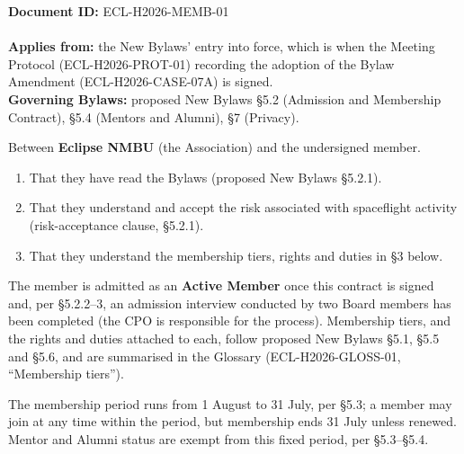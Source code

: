 \documentclass{../../../Common/Latex/Templates/rapport}
\date{\meetingdate, \meetingtime}
\begin{document}
\makecoverpage
\tableofcontents
\reportmainmatter

\noindent\textbf{Document ID:} ECL-H2026-MEMB-01\\
\meetingline\\
\textbf{Applies from:} the New Bylaws' entry into force, which is when the Meeting Protocol (ECL-H2026-PROT-01) recording the adoption of the Bylaw Amendment (ECL-H2026-CASE-07A) is signed.\\
\textbf{Governing Bylaws:} proposed New Bylaws \S5.2 (Admission and Membership Contract), \S5.4 (Mentors and Alumni), \S7 (Privacy).

Between \textbf{Eclipse NMBU} (the Association) and the undersigned member.

\begin{enumerate}
  \item That they have read the Bylaws (proposed New Bylaws \S5.2.1).
  \item That they understand and accept the risk associated with spaceflight activity (risk-acceptance clause, \S5.2.1).
  \item That they understand the membership tiers, rights and duties in \S3 below.
\end{enumerate}

The member is admitted as an \textbf{Active Member} once this contract is signed and, per \S5.2.2--3, an admission interview conducted by two Board members has been completed (the CPO is responsible for the process). Membership tiers, and the rights and duties attached to each, follow proposed New Bylaws \S5.1, \S5.5 and \S5.6, and are summarised in the Glossary (ECL-H2026-GLOSS-01, ``Membership tiers'').

The membership period runs from 1 August to 31 July, per \S5.3; a member may join at any time within the period, but membership ends 31 July unless renewed. Mentor and Alumni status are exempt from this fixed period, per \S5.3--\S5.4.
\end{document}
